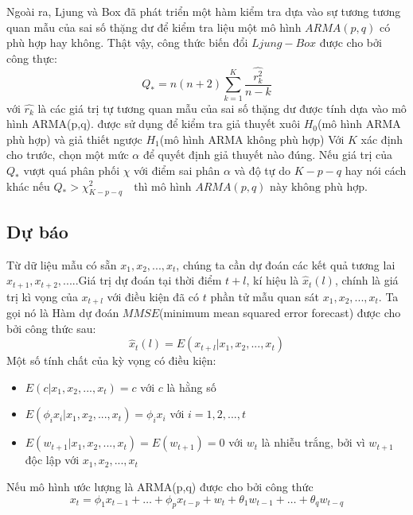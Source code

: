 Ngoài ra, Ljung và Box \citep{lb78} đã phát triển một hàm kiểm tra dựa vào sự tương tương quan mẫu của sai số thặng dư để kiểm tra liệu một mô hình $ARMA(p,q)$ có phù hợp hay không. 
Thật vậy, công thức biến đổi $Ljung-Box$ được cho bởi công thực:
\begin{equation}
Q_* = n(n+2)\sum\limits^{K}_{k=1}\frac{\hat{r_k^2}}{n-k}
\end{equation}
với $\hat{r_k}$ là các giá trị tự tương quan mẫu của sai số thặng dư được tính dựa vào mô hình ARMA(p,q).
được sử dụng để kiểm tra giả thuyết xuôi $H_0$(mô hình ARMA phù hợp) và giả thiết ngược $H_1$(mô hình ARMA không phù hợp)
Với $K$ xác định cho trước, chọn một mức $\alpha$ để quyết định giả thuyết nào đúng. Nếu giá trị của $Q_*$ vượt quá phân phối $\chi$ với điểm sai phân $\alpha$ và độ tự do $K-p-q$ hay nói cách khác nếu \quad
	$Q_{*} > \chi^2_{K-p-q} \quad\text{thì mô hình $ARMA(p,q)$ này không phù hợp.}$

\subsection{Dự báo}

Từ dữ liệu mẫu có sẵn $x_1,x_2,...,x_t$, chúng ta cần dự đoán các kết quả tương lai $x_{t+1},x_{t+2},....$.Giá trị dự đoán tại thời điểm $t+l$, kí hiệu là $\hat{x}_t(l)$, chính là giá trị kì vọng của $x_{t+l}$ với điều kiện đã có $t$ phần tử mẫu quan sát $x_1,x_2,...,x_t$. Ta gọi nó là Hàm dự đoán $MMSE$(minimum mean squared error forecast) được cho bởi công thức sau:
\begin{equation}
	\hat{x}_t(l) = E(x_{t+l}|x_1,x_2,...,x_t)
\end{equation}
Một số tính chất của kỳ vọng có điều kiện:
\begin{itemize}
\item $E(c|x_1,x_2,...,x_t) = c $ với $c$ là hằng số
\item $E(\phi_i{x_i}|x_1,x_2,...,x_t) = \phi_i x_i$ với $i = 1,2,...,t$
\item $E(w_{t+1}|x_1,x_2,...,x_t) = E(w_{t+1}) = 0$ với ${w_t}$ là nhiễu trắng, bởi vì $w_{t+1}$ độc lập với $x_1,x_2,...,x_t$
\end{itemize}

Nếu mô hình ước lượng là ARMA(p,q) được cho bởi công thức
\begin{equation}
	x_t = \phi_1x_{t-1}+\dots+\phi_px_{t-p}+w_t+\theta_1w_{t-1}+\dots+\theta_qw_{t-q}
\end{equation}

